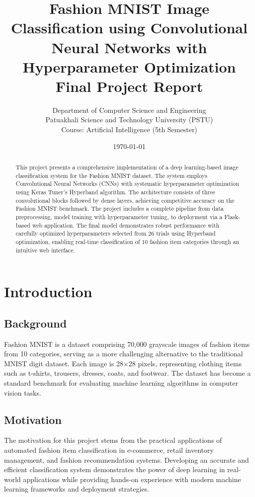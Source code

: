 \documentclass[12pt,a4paper]{article}
\title{
    \vspace{-2cm}
    \textbf{Fashion MNIST Image Classification using Convolutional Neural Networks with Hyperparameter Optimization}\\
    \vspace{0.5cm}
    \large Final Project Report
}
\author{
    Department of Computer Science and Engineering\\
    Patuakhali Science and Technology University (PSTU)\\
    \vspace{0.3cm}
    Course: Artificial Intelligence (5th Semester)
}
\date{\today}
\begin{document}
\maketitle
\thispagestyle{empty}

\begin{abstract}
This project presents a comprehensive implementation of a deep learning-based image classification system for the Fashion MNIST dataset. The system employs Convolutional Neural Networks (CNNs) with systematic hyperparameter optimization using Keras Tuner's Hyperband algorithm. The architecture consists of three convolutional blocks followed by dense layers, achieving competitive accuracy on the Fashion MNIST benchmark. The project includes a complete pipeline from data preprocessing, model training with hyperparameter tuning, to deployment via a Flask-based web application. The final model demonstrates robust performance with carefully optimized hyperparameters selected from 26 trials using Hyperband optimization, enabling real-time classification of 10 fashion item categories through an intuitive web interface.
\end{abstract}

\newpage
\tableofcontents
\newpage

\section{Introduction}

\subsection{Background}
Fashion MNIST is a dataset comprising 70,000 grayscale images of fashion items from 10 categories, serving as a more challenging alternative to the traditional MNIST digit dataset. Each image is 28×28 pixels, representing clothing items such as t-shirts, trousers, dresses, coats, and footwear. The dataset has become a standard benchmark for evaluating machine learning algorithms in computer vision tasks.

\subsection{Motivation}
The motivation for this project stems from the practical applications of automated fashion item classification in e-commerce, retail inventory management, and fashion recommendation systems. Developing an accurate and efficient classification system demonstrates the power of deep learning in real-world applications while providing hands-on experience with modern machine learning frameworks and deployment strategies.
\end{document}
